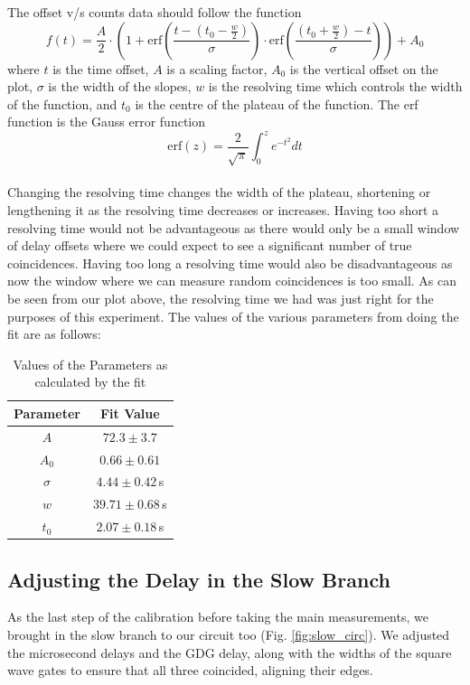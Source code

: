 The offset v/s counts data should follow the function
$$f(t) = \frac{A}{2} \cdot \left( 1 + \text{erf}\left( \frac{t-(t_0-\frac{w}{2})}{\sigma} \right) \cdot \text{erf}\left( \frac{(t_0+\frac{w}{2})-t}{\sigma} \right) \right) + A_0$$
where $t$ is the time offset, $A$ is a scaling factor, $A_0$ is the vertical offset on the plot, $\sigma$ is the width of the slopes, $w$ is the resolving time which controls the width of the function, and $t_0$ is the centre of the plateau of the function. The erf function is the Gauss error function
$$\text{erf}(z) = \frac{2}{\sqrt{\pi}} \int_0^z e^{-t^2} dt$$\\

Changing the resolving time changes the width of the plateau, shortening or lengthening it as the resolving time decreases or increases. Having too short a resolving time would not be advantageous as there would only be a small window of delay offsets where we could expect to see a significant number of true coincidences. Having too long a resolving time would also be disadvantageous as now the window where we can measure random coincidences is too small. As can be seen from our plot above, the resolving time we had was just right for the purposes of this experiment. The values of the various parameters from doing the fit are as follows:
\begin{table}
    \centering
    \begin{tabular}{cc}
        \hline
        Parameter & Fit Value \\
        \hline
        $A$ & $72.3 \pm 3.7$ \\
        $A_0$ & $0.66 \pm 0.61$ \\
        $\sigma$ & $4.44 \pm 0.42\,$s \\
        $w$ & $39.71 \pm 0.68\,$s \\
        $t_0$ & $2.07 \pm 0.18\,$s \\
        \hline
    \end{tabular}
    \caption{Values of the Parameters as calculated by the fit}
    \label{tab:fitvals}
\end{table}

\subsection{Adjusting the Delay in the Slow Branch}

As the last step of the calibration before taking the main measurements, we brought in the slow branch to our circuit too (Fig. \ref{fig:slow_circ}). We adjusted the microsecond delays and the GDG delay, along with the widths of the square wave gates to ensure that all three coincided, aligning their edges.\\

